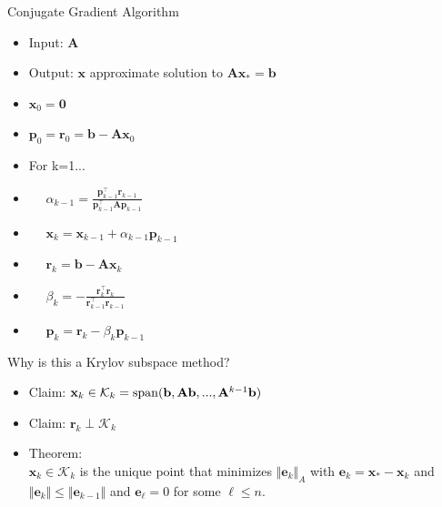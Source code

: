 \documentclass{beamer}
\newcommand{\bgk}[1]{\boldsymbol{#1}}
\newcommand{\bzero}{\bgk{0}}
\newcommand{\bvec}[1]{\mathbf{#1}}
\newcommand{\vb}{\bvec{b}}
\newcommand{\ve}{\bvec{e}}
\newcommand{\vp}{\bvec{p}}
\newcommand{\vr}{\bvec{r}}
\newcommand{\vx}{\bvec{x}}
\newcommand{\vA}{\bvec{A}}
\newcommand{\bitem}{\item[$\bullet$]}
\begin{document}
\begin{frame}{Conjugate Gradient Algorithm}

\begin{itemize}
    \item[] Input: $\vA$\vspace{-2mm}
    \item[] Output: $\vx$ approximate solution to $\vA \vx_* = \vb$
    \item[] $\vx_0 = \bzero$
    \item[] $\vp_0 = \vr_0 = \vb - \vA \vx_0$
    \item[] For k=1...
    \item[] $\quad$ $\alpha_{k-1} = \frac{\vp_{k-1}^\top \vr_{k-1}}{\vp_{k-1}^\top \vA \vp_{k-1}}$
    \item[] $\quad$ $\vx_k = \vx_{k-1} + \alpha_{k-1} \vp_{k-1}$
    \item[] $\quad$ $\vr_k = \vb - \vA \vx_{k}$ 
    \item[] $\quad$ $\beta_k = -\frac{\vr_k^\top \vr_k}{\vr_{k-1}^\top \vr_{k-1}}$
    \item[] $\quad$ $\vp_{k} = \vr_{k} - \beta_k \vp_{k-1}$
\end{itemize}

    
\end{frame}


\begin{frame}{}

\begin{center}
Why is this a Krylov subspace method?
\end{center}
    
\end{frame}


\begin{frame}{}
\begin{itemize}
    \bitem Claim:
$\vx_k\in\mathcal{K}_k = {\rm span}(\vb, \vA\vb,...,\vA^{k-1}\vb)$
    \bitem Claim: $\vr_k \perp \mathcal{K}_k$
\bitem Theorem: \\
$\vx_k\in \mathcal{K}_k$ is the unique point that minimizes $\Vert \ve_k \Vert_A$ with $\ve_k = \vx_* - \vx_k$ and $\Vert \ve_k \Vert\leq \Vert \ve_{k-1} \Vert$ and $\ve_\ell = 0 $ for some $\ell \leq n$.
\end{itemize}
\end{frame}
\end{document}
